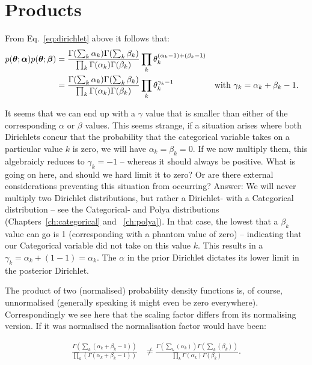 \documentclass[oneside,english]{scrbook}
\begin{document}
\section{Products}

From Eq.~\ref{eq:dirichlet} above it follows that:
\begin{align}
  p(\bm{\theta}; \bm{\alpha}) p(\bm{\theta}; \bm{\beta})
  &= \frac{\Gamma(\sum_k \alpha_k)\Gamma(\sum_k \beta_k)}{\prod_{k}\Gamma(\alpha_k)\Gamma(\beta_k)}
  \prod_{k}\theta_k^{(\alpha_k-1) + (\beta_k-1)} \notag\\
    &= \frac{\Gamma(\sum_k \alpha_k)\Gamma(\sum_k \beta_k)}{\prod_{k}\Gamma(\alpha_k)\Gamma(\beta_k)}
  \prod_{k}\theta_k^{\gamma_k-1} && \text{with } \gamma_k = \alpha_k+\beta_k-1.
  \label{eq:dirichlet_product}
\end{align}

It seems that we can end up with a $\gamma$ value that is smaller than
either of the corresponding $\alpha$ or $\beta$ values. This seems
strange, if a situation arises where both Dirichlets concur that the
probability that the categorical variable takes on a particular value
$k$ is zero, we will have $\alpha_k = \beta_k = 0$. If we now multiply
them, this algebraicly reduces to $\gamma_k=-1$ -- whereas it should
always be positive.  What is going on here, and should we hard limit
it to zero? Or are there external considerations preventing this
situation from occurring? Answer: We will never multiply two Dirichlet
distributions, but rather a Dirichlet- with a Categorical distribution
-- see the Categorical- and Polya distributions
(Chapters~\ref{ch:categorical} and ~\ref{ch:polya}). In that case, the
lowest that a $\beta_k$ value can go is 1 (corresponding with a
phantom value of zero) -- indicating that our Categorical variable did
not take on this value $k$. This results in a $\gamma_k = \alpha_k +
(1-1) = \alpha_k$. The $\alpha$ in the prior Dirichlet dictates its
lower limit in the posterior Dirichlet.

The product of two (normalised) probability density functions is, of
course, unnormalised (generally speaking it might even be zero
everywhere). Correspondingly we see here that the scaling factor differs
from its normalising version. If it was normalised the normalisation
factor would have been:

\begin{align*}
  \frac{\Gamma(\sum_k (\alpha_k+\beta_k-1) )}{\prod_k( \Gamma(\alpha_k+\beta_k-1) )}
  &\neq \frac{\Gamma( \sum_k(\alpha_k) )\Gamma( \sum_k (\beta_k) )}{\prod_{k}\Gamma(\alpha_k)\Gamma(\beta_k)}.
\end{align*}
\end{document}
